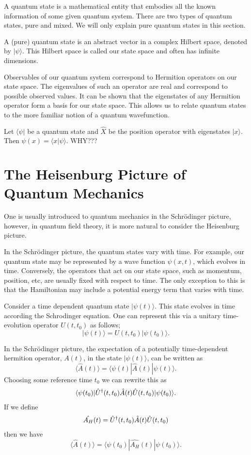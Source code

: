 \documentclass[11pt, a4paper]{article}
\theoremstyle{definition}
\theoremstyle{plain}
\begin{document}
A quantum state is a mathematical entity that embodies all 
the known information of some given quantum system. There 
are two types of quantum states, pure and mixed. We will 
only explain pure quantum states in this section.

A (pure) quantum state is an abstract vector in a complex 
Hilbert space, denoted by $| \psi \rangle $. This Hilbert 
space is called our state space and often has infinite 
dimensions.

Observables of our quantum system correspond to Hermition 
operators on our state space. The eigenvalues of such an 
operator are real and correspond to possible observed 
values. It can be shown that the eigenstates of any 
Hermition operator form a basis for our state space. This 
allows us to relate quantum states to the more familiar 
notion of a quantum wavefunction.

Let $\langle \psi |$ be a quantum state and $\hat{X}$ be the position operator with eigenstates $|x \rangle$. Then $\psi (x) = \langle x | \psi \rangle$. WHY???


\section{The Heisenburg Picture of Quantum Mechanics}

One is usually introduced to quantum mechanics in the 
Schrödinger picture, however, in quantum field theory, 
it is more natural to consider the Heisenburg picture.

In the Schrödinger picture, the quantum states vary with 
time. For example, our quantum state may be represented 
by a wave function $\psi(x,t)$, which evolves in time. 
Conversely,
the operators that act on our state space, such as 
momentum, position, etc, are usually fixed with respect to time. 
The only exception to this is that the Hamiltonian may include 
a potential energy term that varies with time. 

Consider a time dependent quantum state 
$| \psi(t) \rangle$. This state evolves in time 
according the  Schrodinger equation. One can 
represent this via a unitary time-evolution operator 
$U(t,t_0)$ 
as follows;
\[ | \psi(t) \rangle = U(t,t_0) | \psi(t_0) \rangle .\]

In the Schrödinger 
picture, the expectation of a potentially time-dependent hermition operator, $A(t)$, in the 
state $| \psi(t) \rangle$,  can be written as 
\[\langle \hat{A}(t) \rangle = \langle \psi(t) | \hat{A}(t) | \psi(t) \rangle.\]
Choosing some reference time $t_0$ we can rewrite this as
\[\langle \psi(t_0) | \hat{U}\textsuperscript{\textdagger}(t,t_0) \hat{A}  (t) \hat{U}(t,t_0) | \psi(t_0) \rangle.\]
If we define 
\[\hat{A_H}(t) = \hat{U}\textsuperscript{\textdagger}(t,t_0) \hat{A}  (t) \hat{U}(t,t_0) \]
then we have 
\[\langle \hat{A}(t) \rangle = \langle \psi(t_0) | \hat{A_H}(t) | \psi(t_0) \rangle.\]
\end{document}
